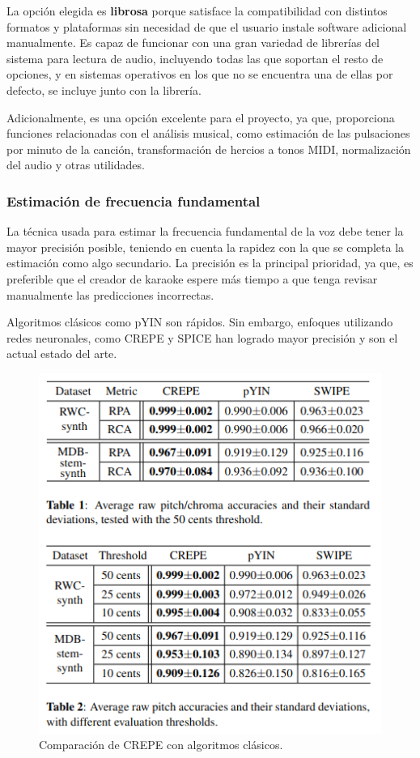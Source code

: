 La opción elegida es \textbf{librosa} porque satisface la compatibilidad con distintos formatos y plataformas sin necesidad de que el usuario instale software adicional manualmente. Es capaz de funcionar con una gran variedad de librerías del sistema para lectura de audio, incluyendo todas las que soportan el resto de opciones, y en sistemas operativos en los que no se encuentra una de ellas por defecto, se incluye junto con la librería.

Adicionalmente, es una opción excelente para el proyecto, ya que, proporciona funciones relacionadas con el análisis musical, como estimación de las pulsaciones por minuto de la canción, transformación de hercios a tonos MIDI, normalización del audio y otras utilidades.

\subsubsection{Estimación de frecuencia fundamental}

La técnica usada para estimar la frecuencia fundamental de la voz debe tener la mayor precisión posible, teniendo en cuenta la rapidez con la que se completa la estimación como algo secundario. La precisión es la principal prioridad, ya que, es preferible que el creador de karaoke espere más tiempo a que tenga revisar manualmente las predicciones incorrectas.

Algoritmos clásicos como pYIN \cite{pYIN} son rápidos. Sin embargo, enfoques utilizando redes neuronales, como CREPE \cite{CREPE} y SPICE \cite{SPICE} han logrado mayor precisión y son el actual estado del arte.

\begin{figure}[h!]
	\centering
	\includegraphics[width=0.7\linewidth]{logos/crepe_comparison}
	\caption{Comparación de CREPE con algoritmos clásicos. \cite{CREPE}}
	\label{fig:crepecomparison}
\end{figure}

